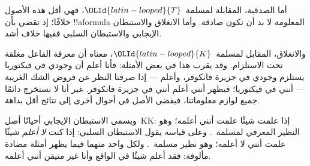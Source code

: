 \documentclass[../../../include/open-logic-section]{subfiles}
\begin{document}
أما الصدقية، المقابلة لمسلمة~${\OLId{latin-looped}{T}}$، فهي أقل هذه الأصول خلافًا؛ إذ تقضي بأن
!!a{formula} المعلومة لا بد أن تكون صادقة. وأما الانغلاق والاستبطان
الإيجابي والاستبطان السلبي ففيها خلاف أشد.

والانغلاق، المقابل لمسلمة~${\OLId{latin-looped}{K}}$، معناه أن معرفة الفاعل مغلقة تحت الاستلزام.
وقد يقرب هذا في بعض الأمثلة: فأنا أعلم أن وجودي في فيكتوريا يستلزم وجودي
في جزيرة فانكوفر، وأعلم --- إذا صرفنا النظر عن فروض الشك الغريبة --- أنني
في فيكتوريا؛ فيظهر أنني أعلم أنني في جزيرة فانكوفر. غير أنا لا نستخرج
دائمًا جميع لوازم معلوماتنا، فيفضي الأصل في أحوال أخرى إلى نتائج أقل
بداهة.

ويسمى الاستبطان الإيجابي أحيانًا أصل~KK: إذا علمت شيئًا علمت أنني أعلمه؛
وهو النظير المعرفي لمسلمة~. وعلى قياسه يقول الاستبطان السلبي: إذا كنت
\emph{لا أعلم} شيئًا علمت أنني لا أعلمه؛ وهو نظير مسلمة~. ولكل واحد
منهما فيما يظهر أمثلة مضادة مألوفة: فقد أعلم شيئًا في الواقع وأنا غير
متيقن أنني أعلمه.
\end{document}
